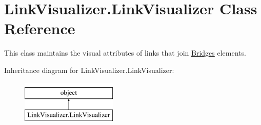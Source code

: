 \hypertarget{class_link_visualizer_1_1_link_visualizer}{}\section{Link\+Visualizer.\+Link\+Visualizer Class Reference}
\label{class_link_visualizer_1_1_link_visualizer}


This class maintains the visual attributes of links that join \hyperlink{namespace_bridges}{Bridges} elements.  


Inheritance diagram for Link\+Visualizer.\+Link\+Visualizer\+:\begin{figure}[H]
\begin{center}
\leavevmode
\includegraphics[height=2.000000cm]{class_link_visualizer_1_1_link_visualizer}
\end{center}
\end{figure}
